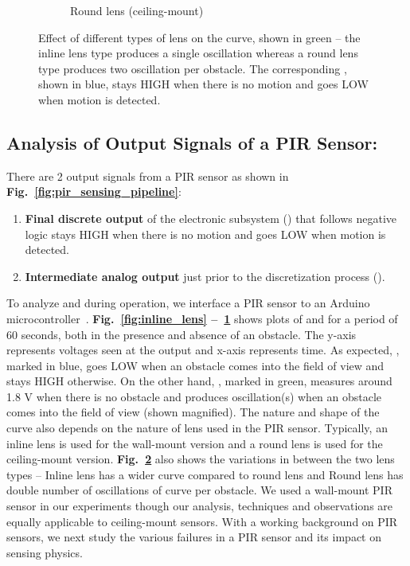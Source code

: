 \begin{figure}
\begin{subfigure}[t]{0.3\textwidth}
		\caption{Round lens (ceiling-mount)}
		\label{fig:round_lens}
	\end{subfigure}	   
	\caption{Effect of different types of lens on the \aout curve, shown in green -- the inline lens type produces a single oscillation whereas a round lens type produces two oscillation per obstacle. The corresponding \cout, shown in blue, stays HIGH when there is no motion and goes LOW when motion is detected. }
	\label{fig:pir_sensor_different_lens}
\end{figure}

\subsection{\textbf{Analysis of Output Signals of a PIR Sensor:}}
\label{subsec:working} 
There are 2 output signals from a PIR sensor as shown in {\bfseries Fig.~\ref{fig:pir_sensing_pipeline}}:
\begin{enumerate} \item \textbf{Final discrete output} of the electronic subsystem (\cout) that follows negative logic \ie stays HIGH when there is no motion and goes LOW when motion is detected. \item \textbf{Intermediate analog output} just prior to the discretization process (\aout). \end{enumerate}

To analyze \cout and \aout during operation, we interface a PIR sensor to an Arduino microcontroller~\cite{arduino_mega}. 
{\bfseries Fig.~\ref{fig:inline_lens} --~\ref{fig:round_lens}} shows plots of \aout and \cout for a period of 60 seconds, both in the presence and absence of an obstacle. The y-axis represents voltages seen at the output and x-axis represents time. As expected, %
\cout, marked in blue, goes LOW when an obstacle comes into the field of view %
and stays HIGH otherwise. On the other hand, %
\aout, marked in green, measures around 1.8 V when there is no obstacle and produces oscillation(s) when an obstacle comes into the field of view (shown magnified). 
%
The nature and shape of the \aout curve also depends on the nature of lens used in the PIR sensor. Typically, an inline lens is used for the wall-mount version and a round lens is used for the ceiling-mount version. {\bfseries Fig.~\ref{fig:pir_sensor_different_lens}} also shows the variations in \aout between the two lens types -- \ca Inline lens has a wider curve compared to round lens and \cb Round lens has double number of oscillations of \aout curve per obstacle. We used a wall-mount PIR sensor in our experiments though our analysis, techniques and observations are equally applicable to ceiling-mount sensors. %
%
With a working background on PIR sensors, we next study the various failures in a PIR sensor and its impact on sensing physics.